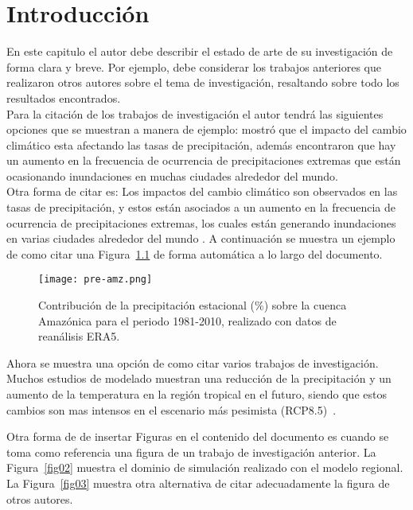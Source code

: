 \chapter{Introducción}
\label{cap1}

En este capitulo el autor debe describir el estado de arte de su investigación de forma clara y breve. Por ejemplo, debe considerar los trabajos anteriores que realizaron otros autores sobre el tema de investigación, resaltando sobre todo los resultados encontrados.\\

Para la citación de los trabajos de investigación el autor tendrá las siguientes opciones que se muestran a manera de ejemplo: \cite{tabari2020} mostró que el impacto del cambio climático esta afectando las tasas de precipitación, además encontraron que hay un aumento en la frecuencia de ocurrencia de precipitaciones extremas que están ocasionando inundaciones en muchas ciudades alrededor del mundo.\\ 

Otra forma de citar es: Los impactos del cambio climático son observados en las tasas de precipitación, y estos están asociados a un aumento en la frecuencia de ocurrencia de precipitaciones extremas, los cuales están generando inundaciones en varias ciudades alrededor del mundo \citep{tabari2020}. A continuación se muestra un ejemplo de como citar una Figura~\ref{fig01} de forma automática a lo largo del documento.\\

\begin{figure}[!ht]
\centering
\texttt{[image: pre-amz.png]}
\caption{Contribución de la precipitación estacional (\%) sobre la cuenca Amazónica para el periodo 1981-2010, realizado con datos de reanálisis ERA5.}
\label{fig01}
\end{figure}


Ahora se muestra una opción de como citar varios trabajos de investigación. Muchos estudios de modelado muestran una reducción de la precipitación y un aumento de la temperatura en la región tropical en el futuro, siendo que estos cambios son mas intensos en el escenario más pesimista (RCP8.5)~\citep{reboita14,reboita21,blazquez20,llopart20}.

Otra forma de de insertar Figuras en el contenido del documento es cuando se toma como referencia una figura de un trabajo de investigación anterior. La Figura~\ref{fig02} muestra el dominio de simulación realizado con el modelo regional. La Figura~\ref{fig03} muestra otra alternativa de citar adecuadamente la figura de otros autores. 

